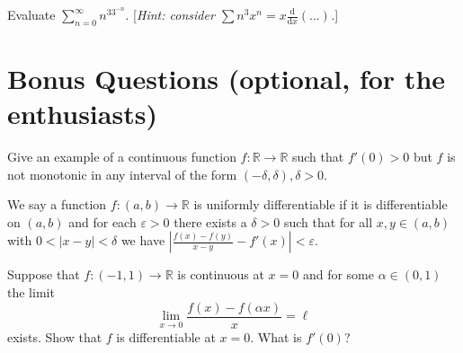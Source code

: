 \documentclass[answers]{exam}
\begin{document}
\begin{questions}
\question%



\question%
Evaluate $\sum_{n=0}^\infty n^33^{-n}$. [\emph{Hint: consider $\sum n^3x^n=x\frac{\mathrm d}{\mathrm dx}(...)$.}]



\section*{Bonus Questions (optional, for the enthusiasts)}

\question%
Give an example of a continuous function $f: \mathbb{R} \to \mathbb{R}$ such that $f'(0)>0$ but $f$ is not monotonic in any interval of the form $(-\delta, \delta), \delta>0$.



\question%
We say a function $f:(a, b) \to \mathbb{R}$ is uniformly differentiable if it is differentiable on $(a, b)$ and for each $\varepsilon>0$ there exists a $\delta>0$ such that for all $x, y \in(a, b)$ with $0<|x-y|<\delta$ we have $\left|\frac{f(x)-f(y)}{x-y}-f'(x)\right|<\varepsilon$.



\question%
Suppose that $f:(-1,1) \to \mathbb{R}$ is continuous at $x=0$ and for some $\alpha \in(0,1)$ the limit \[
	\lim _{x \to 0} \frac{f(x)-f(\alpha x)}{x}=\ell
\] exists. Show that $f$ is differentiable at $x=0$. What is $f'(0)$?

\end{questions}
\end{document}
